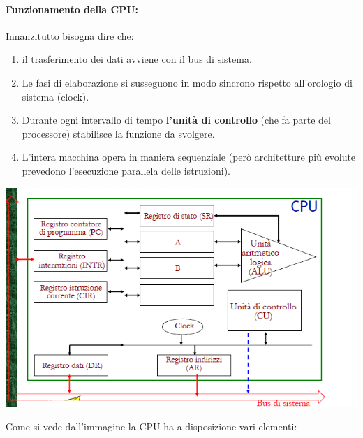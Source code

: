 \documentclass[
  paper=a4,
  oneside  ,captions=tableheading
]{scrbook}
\providecommand{\tightlist}{%
  \setlength{\itemsep}{0pt}\setlength{\parskip}{0pt}}
\begin{document}
\hypertarget{funzionamento-della-cpu}{%
\paragraph{Funzionamento della CPU:}\label{funzionamento-della-cpu}}

Innanzitutto bisogna dire che:

\begin{enumerate}
\def\labelenumi{\arabic{enumi}.}
\tightlist
\item
  il trasferimento dei dati avviene con il bus di sistema.
\item
  Le fasi di elaborazione si susseguono in modo sincrono rispetto
  all'orologio di sistema (clock).
\item
  Durante ogni intervallo di tempo \textbf{l'unità di controllo} (che fa
  parte del processore) stabilisce la funzione da svolgere.
\item
  L'intera macchina opera in maniera sequenziale (però architetture più
  evolute prevedono l'esecuzione parallela delle istruzioni).
\end{enumerate}

\includegraphics{./image/image-20201111191808017.png}

Come si vede dall'immagine la CPU ha a disposizione vari elementi:
\end{document}
